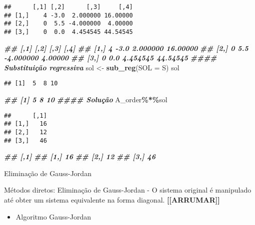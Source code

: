 \documentclass[
]{article}
\newenvironment{Shaded}{\begin{snugshade}}{\end{snugshade}}
\newcommand{\AttributeTok}[1]{\textcolor[rgb]{0.13,0.29,0.53}{#1}}
\newcommand{\DocumentationTok}[1]{\textcolor[rgb]{0.56,0.35,0.01}{\textbf{\textit{#1}}}}
\newcommand{\FunctionTok}[1]{\textcolor[rgb]{0.13,0.29,0.53}{\textbf{#1}}}
\newcommand{\NormalTok}[1]{#1}
\newcommand{\OtherTok}[1]{\textcolor[rgb]{0.56,0.35,0.01}{#1}}
\newcommand{\SpecialCharTok}[1]{\textcolor[rgb]{0.81,0.36,0.00}{\textbf{#1}}}
\providecommand{\tightlist}{%
  \setlength{\itemsep}{0pt}\setlength{\parskip}{0pt}}
\begin{document}
\begin{verbatim}
##      [,1] [,2]      [,3]     [,4]
## [1,]    4 -3.0  2.000000 16.00000
## [2,]    0  5.5 -4.000000  4.00000
## [3,]    0  0.0  4.454545 44.54545
\end{verbatim}

\begin{Shaded}
\begin{Highlighting}[]
\DocumentationTok{\#\# [,1] [,2] [,3] [,4]}
\DocumentationTok{\#\# [1,] 4 {-}3.0 2.000000 16.00000}
\DocumentationTok{\#\# [2,] 0 5.5 {-}4.000000 4.00000}
\DocumentationTok{\#\# [3,] 0 0.0 4.454545 44.54545}
\DocumentationTok{\#\#\#\# Substituição regressiva}
\NormalTok{sol }\OtherTok{\textless{}{-}} \FunctionTok{sub\_reg}\NormalTok{(}\AttributeTok{SOL =}\NormalTok{ S)}
\NormalTok{sol}
\end{Highlighting}
\end{Shaded}

\begin{verbatim}
## [1]  5  8 10
\end{verbatim}

\begin{Shaded}
\begin{Highlighting}[]
\DocumentationTok{\#\# [1] 5 8 10}
\DocumentationTok{\#\#\#\# Solução}
\NormalTok{A\_order}\SpecialCharTok{\%*\%}\NormalTok{sol}
\end{Highlighting}
\end{Shaded}

\begin{verbatim}
##      [,1]
## [1,]   16
## [2,]   12
## [3,]   46
\end{verbatim}

\begin{Shaded}
\begin{Highlighting}[]
\DocumentationTok{\#\# [,1]}
\DocumentationTok{\#\# [1,] 16}
\DocumentationTok{\#\# [2,] 12}
\DocumentationTok{\#\# [3,] 46}
\end{Highlighting}
\end{Shaded}

Eliminação de Gauss-Jordan

Métodos diretos: Eliminação de Gauss-Jordan - O sistema original é
manipulado até obter um sistema equivalente na forma diagonal.
\textbf{{[}{[}ARRUMAR{]}{]}}

\begin{itemize}
\tightlist
\item
  Algoritmo Gauss-Jordan
\end{itemize}
\end{document}

